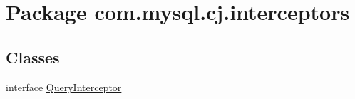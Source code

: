 \hypertarget{namespacecom_1_1mysql_1_1cj_1_1interceptors}{}\section{Package com.\+mysql.\+cj.\+interceptors}
\label{namespacecom_1_1mysql_1_1cj_1_1interceptors}
\subsection*{Classes}
\begin{DoxyCompactItemize}
\item 
interface \mbox{\hyperlink{interfacecom_1_1mysql_1_1cj_1_1interceptors_1_1_query_interceptor}{Query\+Interceptor}}
\end{DoxyCompactItemize}
